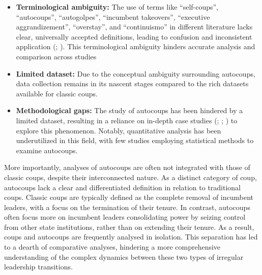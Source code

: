 \documentclass[
  12pt,
]{report}
\begin{document}
\begin{itemize}
\item
  \textbf{Terminological ambiguity:} The use of terms like
  ``self-coups'', ``autocoups'', ``autogolpes'', ``incumbent
  takeovers'', ``executive aggrandizement'', ``overstay'', and
  ``continuismo'' in different literature lacks clear, universally
  accepted definitions, leading to confusion and inconsistent
  application (; ).
  This terminological ambiguity hinders accurate analysis and comparison
  across studies
\item
  \textbf{Limited dataset:} Due to the conceptual ambiguity surrounding
  autocoups, data collection remains in its nascent stages compared to
  the rich datasets available for classic coups.
\item
  \textbf{Methodological gaps:} The study of autocoups has been hindered
  by a limited dataset, resulting in a reliance on in-depth case studies
  (;
  ;
  )
  to explore this phenomenon. Notably, quantitative analysis has been
  underutilized in this field, with few studies employing statistical
  methods to examine autocoups.
\end{itemize}

More importantly, analyses of autocoups are often not integrated with
those of classic coups, despite their interconnected nature. As a
distinct category of coup, autocoups lack a clear and differentiated
definition in relation to traditional coups. Classic coups are typically
defined as the complete removal of incumbent leaders, with a focus on
the termination of their tenure. In contrast, autocoups often focus more
on incumbent leaders consolidating power by seizing control from other
state institutions, rather than on extending their tenure. As a result,
coups and autocoups are frequently analysed in isolation. This
separation has led to a dearth of comparative analyses, hindering a more
comprehensive understanding of the complex dynamics between these two
types of irregular leadership transitions.
\end{document}
